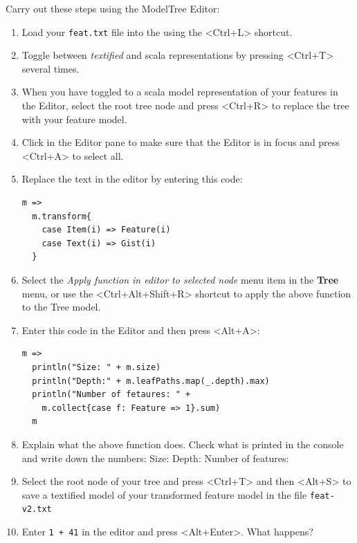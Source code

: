 \documentclass[11pt]{article}
\begin{document}
\begin{framed}
\noindent Carry out these steps using the ModelTree Editor:
\begin{enumerate}
\item Load your \verb+feat.txt+ file into the using the <Ctrl+L> shortcut.
\item Toggle between {\it textified} and scala representations by pressing <Ctrl+T> several times.
\item When you have toggled to a scala model representation of your features in the Editor, select the root tree node and press <Ctrl+R> to replace the tree with your feature model.
\item Click in the Editor pane to make sure that the Editor is in focus and press <Ctrl+A> to select all.
\item Replace the text in the editor by entering this code: {\scriptsize\begin{verbatim}
m =>
  m.transform{
    case Item(i) => Feature(i)
    case Text(i) => Gist(i)
  }
\end{verbatim}}



\item Select the {\it Apply function in editor to selected node} menu item in the {\bf Tree} menu, or use the <Ctrl+Alt+Shift+R> shortcut to apply the above function to the Tree model.


\item Enter this code in the Editor and then press <Alt+A>: {\scriptsize\begin{verbatim}
m =>
  println("Size: " + m.size)
  println("Depth:" + m.leafPaths.map(_.depth).max)
  println("Number of fetaures: " + 
    m.collect{case f: Feature => 1}.sum)
  m
\end{verbatim}}



\item Explain what the above function does. Check what is printed in the console and write down the numbers: 
\newline Size: \underline{\hspace{1cm}} Depth: \underline{\hspace{1cm}}  Number of features: \underline{\hspace{1cm}}

\item Select the root node of your tree and press <Ctrl+T> and then <Alt+S> to save a textified model of your transformed feature model in the file \verb+feat-v2.txt+


\item Enter \verb?1 + 41? in the editor and press <Alt+Enter>. What happens?
\end{enumerate}
\end{framed}
\end{document}
